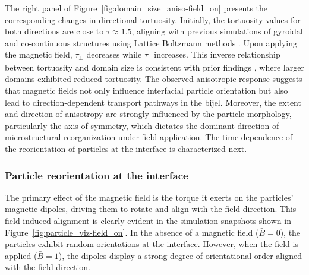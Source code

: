 The right panel of Figure~\ref{fig:domain_size_aniso-field_on} presents the corresponding changes in directional tortuosity. Initially, the tortuosity values 
for both directions are close to \(\tau \approx 1.5\), aligning with previous simulations of gyroidal and co-continuous structures using Lattice Boltzmann methods 
\cite{luo_macroscopic_2020}. Upon applying the magnetic field, \(\tau_\perp\) decreases while \(\tau_\parallel\) increases. This inverse relationship between 
tortuosity and domain size is consistent with prior findings \cite{karthikeyan_formation_2024}, where larger domains exhibited 
reduced tortuosity. The observed anisotropic response suggests that magnetic fields not only influence interfacial particle orientation but also lead to 
direction-dependent transport pathways in the bijel. Moreover, the extent and direction of anisotropy are strongly influenced by the particle morphology, 
particularly the axis of symmetry, which dictates the dominant direction of microstructural reorganization under field application. The time dependence of
the reorientation of particles at the interface is characterized next.

\subsubsection{Particle reorientation at the interface}

The primary effect of the magnetic field is the torque it exerts on the particles' magnetic dipoles, driving them to rotate and align with the field direction. 
This field-induced alignment is clearly evident in the simulation snapshots shown in Figure~\ref{fig:particle_viz-field_on}. In the absence of a magnetic field 
(\(\bar{B} = 0\)), the particles exhibit random orientations at the interface. However, when the field is applied (\(\bar{B} = 1\)), the dipoles display a strong 
degree of orientational order aligned with the field direction.

